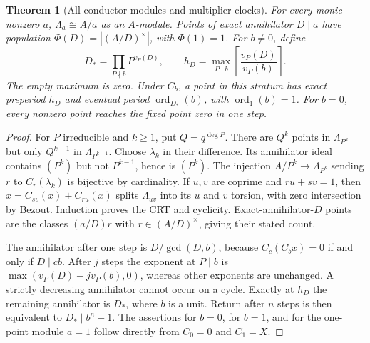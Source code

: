 \documentclass[10pt]{article}
\newtheorem{theorem}{Theorem}
\newcommand{\ord}{\operatorname{ord}}
\begin{document}
\begin{theorem}[All conductor modules and multiplier clocks]
For every monic nonzero $a$, $\Lambda_a\cong A/a$ as an $A$-module.
Points of exact annihilator $D\mid a$ have population
$\Phi(D)=|(A/D)^\times|$, with $\Phi(1)=1$.
For $b\ne0$, define
\[
 D_* =\prod_{P\nmid b}P^{v_P(D)},\qquad
 h_D=\max_{P\mid b}\left\lceil\frac{v_P(D)}{v_P(b)}\right\rceil .
\]
The empty maximum is zero. Under $C_b$, a point in this stratum has exact
preperiod $h_D$ and eventual period $\ord_{D_*}(b)$, with $\ord_1(b)=1$.
For $b=0$, every nonzero point reaches the fixed point zero in one step.
\end{theorem}
\begin{proof}
For $P$ irreducible and $k\geq1$, put $Q=q^{\deg P}$.
There are $Q^k$ points in $\Lambda_{P^k}$ but only $Q^{k-1}$ in
$\Lambda_{P^{k-1}}$. Choose $\lambda_k$ in their difference. Its annihilator
ideal contains $(P^k)$ but not $P^{k-1}$, hence is $(P^k)$.
The injection $A/P^k\to\Lambda_{P^k}$ sending $r$ to $C_r(\lambda_k)$
is bijective by cardinality. If $u,v$ are coprime and $ru+sv=1$, then
$x=C_{sv}(x)+C_{ru}(x)$ splits $\Lambda_{uv}$ into its $u$ and $v$
torsion, with zero intersection by Bezout. Induction proves the CRT and
cyclicity. Exact-annihilator-$D$ points are the classes $(a/D)r$ with
$r\in(A/D)^\times$, giving their stated count.

The annihilator after one step is $D/\gcd(D,b)$, because
$C_c(C_bx)=0$ if and only if $D\mid cb$. After $j$ steps the exponent
at $P\mid b$ is $\max(v_P(D)-jv_P(b),0)$, whereas other exponents
are unchanged. A strictly decreasing annihilator cannot occur on a cycle.
Exactly at $h_D$ the remaining annihilator is $D_*$, where $b$ is a unit.
Return after $n$ steps is then equivalent to $D_*\mid b^n-1$.
The assertions for $b=0$, for $b=1$, and for the one-point module $a=1$
follow directly from $C_0=0$ and $C_1=X$.
\end{proof}
\end{document}

